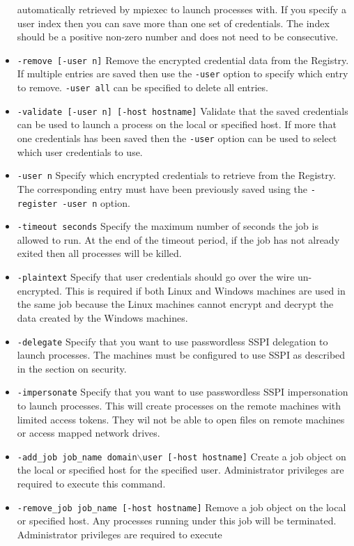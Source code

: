 \documentclass[dvipdfm,11pt]{article}
\begin{document}
\begin{itemize}
automatically retrieved by mpiexec to launch processes with.  If you specify
a user index then you can save more than one set of credentials.  The index
should be a positive non-zero number and does not need to be consecutive.
\item \texttt{-remove [-user n]}
Remove the encrypted credential data from the Registry.  If multiple entries are
saved then use the \texttt{-user} option to specify which entry to remove.
\texttt{-user all} can be specified to delete all entries.
\item \texttt{-validate [-user n] [-host hostname]}
Validate that the saved credentials can be used to launch a process on the local
or specified host.  If more that one credentials has been saved then the 
\texttt{-user} option can be used to select which user credentials to use.
\item \texttt{-user n}
Specify which encrypted credentials to retrieve from the Registry.  The corresponding
entry must have been previously saved using the \texttt{-register -user n} option.
\item \texttt{-timeout seconds}
Specify the maximum number of seconds the job is allowed to run.  At the end of
the timeout period, if the job has not already exited then all processes will
be killed.
\item \texttt{-plaintext}
Specify that user credentials should go over the wire un-encrypted.  This is
required if both Linux and Windows machines are used in the same job because
the Linux machines cannot encrypt and decrypt the data created by the Windows
machines.
\item \texttt{-delegate}
Specify that you want to use passwordless SSPI delegation to launch processes.
The machines must be configured to use SSPI as described in the section on 
security.
\item \texttt{-impersonate}
Specify that you want to use passwordless SSPI impersonation to launch processes.
This will create processes on the remote machines with limited access tokens.
They wil not be able to open files on remote machines or access mapped network
drives.
\item \texttt{-add\_job job\_name domain$\backslash$user [-host hostname]}
Create a job object on the local or specified host for the specified user.
Administrator privileges are required to execute this command.
\item \texttt{-remove\_job job\_name [-host hostname]}
Remove a job object on the local or specified host.  Any processes running under
this job will be terminated.  Administrator privileges are required to execute

\end{itemize}
\end{document}
